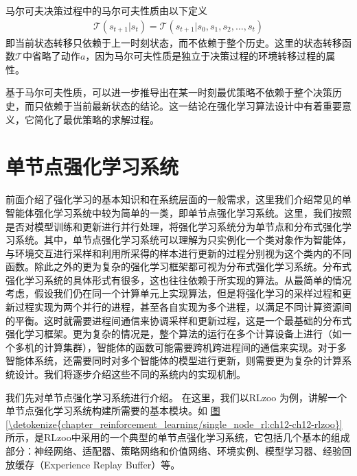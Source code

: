 \documentclass[letterpaper,10pt,english]{sphinxmanual}
\begin{document}
\sphinxAtStartPar
马尔可夫决策过程中的马尔可夫性质由以下定义
\begin{equation}\label{equation:chapter_reinforcement_learning/rl_introduction:chapter_reinforcement_learning/rl_introduction:0}
\begin{split}\mathcal{T}(s_{t+1}|s_t) = \mathcal{T}(s_{t+1}|s_0, s_1, s_2, \dots, s_t)\end{split}
\end{equation}
\sphinxAtStartPar
即当前状态转移只依赖于上一时刻状态，而不依赖于整个历史。这里的状态转移函数\(\mathcal{T}\)中省略了动作\(a\)，因为马尔可夫性质是独立于决策过程的环境转移过程的属性。

\sphinxAtStartPar
基于马尔可夫性质，可以进一步推导出在某一时刻最优策略不依赖于整个决策历史，而只依赖于当前最新状态的结论。这一结论在强化学习算法设计中有着重要意义，它简化了最优策略的求解过程。


\section{单节点强化学习系统}
\label{\detokenize{chapter_reinforcement_learning/single_node_rl:id1}}\label{\detokenize{chapter_reinforcement_learning/single_node_rl::doc}}
\sphinxAtStartPar
前面介绍了强化学习的基本知识和在系统层面的一般需求，这里我们介绍常见的单智能体强化学习系统中较为简单的一类，即单节点强化学习系统。这里，我们按照是否对模型训练和更新进行并行处理，将强化学习系统分为单节点和分布式强化学习系统。其中，单节点强化学习系统可以理解为只实例化一个类对象作为智能体，与环境交互进行采样和利用所采得的样本进行更新的过程分别视为这个类内的不同函数。除此之外的更为复杂的强化学习框架都可视为分布式强化学习系统。分布式强化学习系统的具体形式有很多，这也往往依赖于所实现的算法。从最简单的情况考虑，假设我们仍在同一个计算单元上实现算法，但是将强化学习的采样过程和更新过程实现为两个并行的进程，甚至各自实现为多个进程，以满足不同计算资源间的平衡。这时就需要进程间通信来协调采样和更新过程，这是一个最基础的分布式强化学习框架。更为复杂的情况是，整个算法的运行在多个计算设备上进行（如一个多机的计算集群），智能体的函数可能需要跨机跨进程间的通信来实现。对于多智能体系统，还需要同时对多个智能体的模型进行更新，则需要更为复杂的计算系统设计。我们将逐步介绍这些不同的系统内的实现机制。

\sphinxAtStartPar
我们先对单节点强化学习系统进行介绍。 在这里，我们以RLzoo
为例，讲解一个单节点强化学习系统构建所需要的基本模块。如
\hyperref[\detokenize{chapter_reinforcement_learning/single_node_rl:ch12-ch12-rlzoo}]{图\ref{\detokenize{chapter_reinforcement_learning/single_node_rl:ch12-ch12-rlzoo}}}所示，是RLzoo中采用的一个典型的单节点强化学习系统，它包括几个基本的组成部分：神经网络、适配器、策略网络和价值网络、环境实例、模型学习器、经验回放缓存（Experience
Replay Buffer）等。
\end{document}
